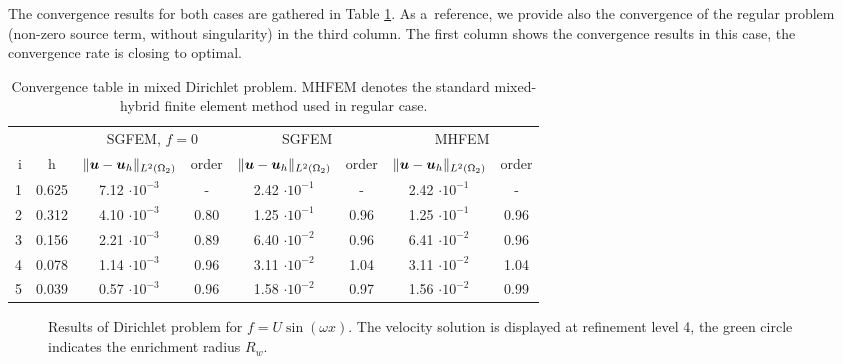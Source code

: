 The convergence results for both cases are gathered in Table \ref{tab:convergence_mh_dirichlet}.
As a~reference, we provide also the convergence of the regular problem (non-zero source term, without singularity)
in the third column.
The first column shows the convergence results in this case, the convergence rate is closing to optimal.
%
\begin{table}[!htb]
\vspace{0.5cm}
\begin{center}
\bgroup
\def\arraystretch{1.2}
\setlength\tabcolsep{5pt}
\begin{tabular}{rc|cc|cc|cc}
\toprule
\multicolumn{2}{c|}{} & \multicolumn{2}{c|}{ SGFEM, $f=0$} & \multicolumn{2}{c|}{SGFEM} & \multicolumn{2}{c}{MHFEM}\\ [3pt] %
i & h & $\|\mathbf{\boldsymbol{u}}-\mathbf{\boldsymbol{u}}_h\|_{L^2(\Omega_2)}$ & order & $\|\mathbf{\boldsymbol{u}}-\mathbf{\boldsymbol{u}}_h\|_{L^2(\Omega_2)}$
    & order & $\|\mathbf{\boldsymbol{u}}-\mathbf{\boldsymbol{u}}_h\|_{L^2(\Omega_2)}$ & order \\ [3pt] \midrule
1 & 0.625 &  7.12 $\cdot10^{-3}$  &  -   &  2.42 $\cdot10^{-1}$  &  -   & 2.42 $\cdot10^{-1}$  &   -   \\
2 & 0.312 &  4.10 $\cdot10^{-3}$  & 0.80 &  1.25 $\cdot10^{-1}$  & 0.96 & 1.25 $\cdot10^{-1}$ &  0.96 \\
3 & 0.156 &  2.21 $\cdot10^{-3}$  & 0.89 &  6.40 $\cdot10^{-2}$  & 0.96 & 6.41 $\cdot10^{-2}$ &  0.96 \\
4 & 0.078 &  1.14 $\cdot10^{-3}$  & 0.96 &  3.11 $\cdot10^{-2}$  & 1.04 & 3.11 $\cdot10^{-2}$ &  1.04 \\
5 & 0.039 &  0.57 $\cdot10^{-3}$  & 0.96 &  1.58 $\cdot10^{-2}$  & 0.97 & 1.56 $\cdot10^{-2}$ &  0.99 \\
\bottomrule
\end{tabular}
\caption[Convergence table in mixed Dirichlet problem.]{Convergence table in mixed Dirichlet problem.
    MHFEM denotes the standard mixed-hybrid finite element method used in regular case.}
\label{tab:convergence_mh_dirichlet}
\egroup
\end{center}
\end{table}
%
\begin{figure}[!htb]
    \centering
    \caption[Dirichlet problem results, nonzero source term.]
    {Results of Dirichlet problem for $f=U\sin(\omega x)$. The velocity solution is displayed at refinement level 4,
    the green circle indicates the enrichment radius $R_w$.}
    \label{fig:mh_dirichlet_source}
\end{figure}

